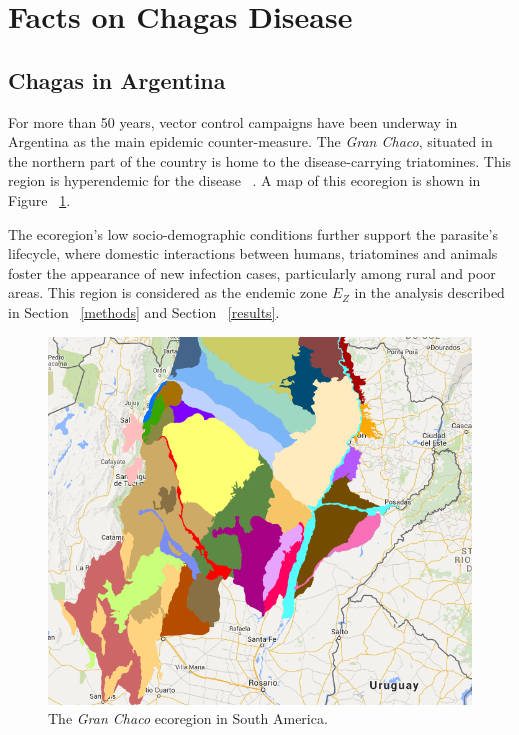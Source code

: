 \section{Facts on Chagas Disease}

\subsection{Chagas in  Argentina}\label{endemic_zone_argentina}

For more than 50 years, vector control campaigns have been underway in Argentina as the main epidemic counter-measure. The \textit{Gran Chaco}, situated in the northern part of the country is home to the disease-carrying triatomines. This region is hyperendemic for the disease~ \textcite{OPS2014mapa}. A map of this ecoregion is shown in Figure~ \cref{fig:granchaco}.

The ecoregion's low socio-demographic conditions further support the parasite's lifecycle, where domestic interactions between humans, triatomines and animals foster the appearance of new infection cases, particularly among rural and poor areas.
This region is considered as the endemic zone $E_Z$ in the analysis described in Section~ \cref{methods} and Section~ \cref{results}.

\begin{figure}[h!]
\centering
\includegraphics[width=0.75\columnwidth]{figures/Ambientes_GranChaco_TNC-Argentina/Ambientes_GranChaco_TNC-Argentina.png}
\caption{The \textit{Gran Chaco} ecoregion in South America.%
}
\label{fig:granchaco}
\end{figure}



